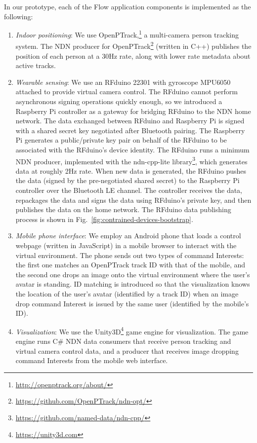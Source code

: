 In our prototype, each of the Flow application components is implemented as the following:
\begin{enumerate}
\item \textit{Indoor positioning}: We use OpenPTrack,\footnote{\url{http://openptrack.org/about/}} a multi-camera person tracking system.
The NDN producer for OpenPTrack\footnote{\url{https://github.com/OpenPTrack/ndn-opt/}} (written in C++)  publishes the position of each person at a 30Hz rate, along with lower rate metadata about active tracks. 
\item \textit{Wearable sensing}: We use an RFduino 22301 with gyroscope MPU6050 attached to provide virtual camera control. 
The RFduino cannot perform asynchronous signing operations quickly enough, so we introduced a Raspberry Pi controller as a gateway for bridging RFduino to the NDN home network.
The data exchanged between RFduino and Raspberry Pi is signed with a shared secret key negotiated after Bluetooth pairing.
The Raspberry Pi generates a public/private key pair on behalf of the RFduino to be associated with the RFduino's device identity.
The RFduino runs a minimum NDN producer, implemented with the ndn-cpp-lite library\footnote{\url{https://github.com/named-data/ndn-cpp/}}, which generates data at roughly 2Hz rate.
When new data is generated, the RFduino pushes the data (signed by the pre-negotiated shared secret) to the Raspberry Pi controller over the Bluetooth LE channel.
The controller receives the data, repackages the data and signs the data using RFduino's private key, and then publishes the data on the home network.
The RFduino data publishing process is shown in Fig.~\ref{fig:contrained-devices-bootstrap}.
\item \textit{Mobile phone interface}: We employ an Android phone that loads a control webpage (written in JavaScript) in a mobile browser to interact with the virtual environment. 
The phone sends out two types of command Interests: the first one matches an OpenPTrack track ID with that of the mobile, and the second one drops an image onto the virtual environment where the user's avatar is standing. ID matching is introduced so that the visualization knows the location of the user's avatar (identified by a track ID) when an image drop command Interest is issued by the same user (identified by the mobile's ID).
\item \textit{Visualization}: We use the Unity3D\footnote{\url{https://unity3d.com}} game engine for visualization.
The game engine runs C\# NDN data consumers that receive person tracking and virtual camera control data, and a producer that receives image dropping command Interests from the mobile web interface.
\end{enumerate}

